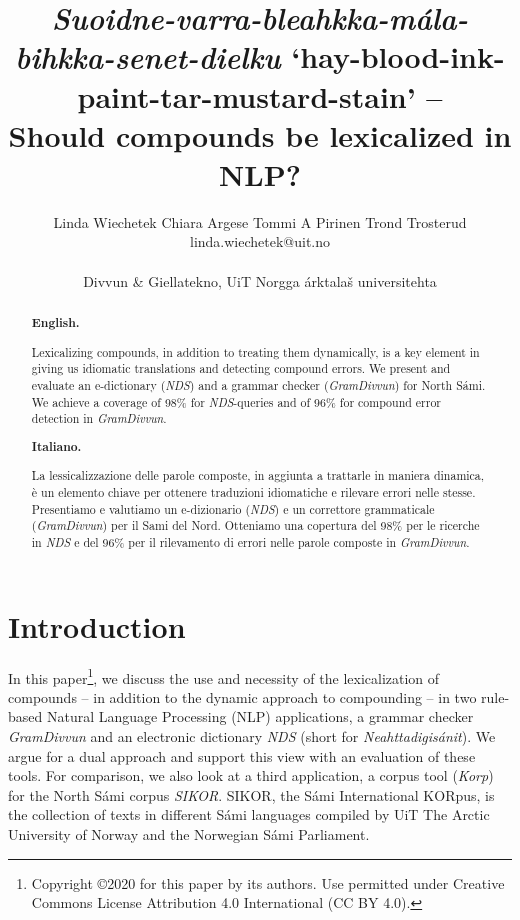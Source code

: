 \documentclass[free]{flammie}
\title{\textit{Suoidne-varra-bleahkka-mála-bihkka-senet-dielku}
`hay-blood-ink-paint-tar-mustard-stain' -- \\ Should compounds be lexicalized in NLP?
\footnotepubrights{Creative Commons CC-BY-SA by conference, the official version
published in CEUR-WS at \url{http://ceur-ws.org/Vol-2769/paper_49.pdf}}}
\author{Linda Wiechetek \qquad Chiara Argese \qquad Tommi A Pirinen \qquad Trond Trosterud\\
{\small linda.wiechetek@uit.no} \qquad {\small chiara.argese@uit.no} \qquad {\small tommi.pirinen@uit.no} \qquad {\small trond.trosterud@uit.no}\\
\\
\vspace{2ex}
  Divvun \& Giellatekno,
  UiT Norgga árktalaš universitehta \\}
\date{}
\begin{document}
\maketitle
\begin{abstract}
  \textbf{English.}

\small Lexicalizing compounds, in addition to treating them dynamically,
is a key element in giving us
idiomatic translations and detecting compound errors.
We present and evaluate an e-dictionary (\textit{NDS}) and
a grammar checker (\textit{GramDivvun}) for North Sámi. We achieve a coverage of
98\% for \textit{NDS}-queries and
of 96\% for compound error detection in \textit{GramDivvun}.
\end{abstract}

\begin{abstract}
 \textrm{\bf{Italiano.}}

\small La lessicalizzazione delle parole composte, in aggiunta a trattarle in maniera dinamica, è un elemento chiave
per ottenere traduzioni idiomatiche e rilevare errori nelle stesse.
Presentiamo e valutiamo un e-dizionario (\textit{NDS}) e un correttore
grammaticale (\textit{GramDivvun}) per il Sami del Nord. Otteniamo una
copertura del 98\% per le ricerche in \textit{NDS} e del 96\% per il rilevamento di errori nelle parole composte in
\textit{GramDivvun}.

\end{abstract}

\section{Introduction}


In this paper\footnote{Copyright ©️2020 for this paper by its authors. Use permitted under Creative Commons License Attribution 4.0 International (CC BY 4.0).}, we discuss the use and necessity of the lexicalization of
compounds -- in addition to the dynamic approach to compounding -- in two rule-based Natural Language Processing (NLP)
applications, a grammar checker \textit{GramDivvun} and an electronic
dictionary \textit{NDS} (short for \textit{Neahttadigisánit}).
We argue for a dual approach and support this view with an
evaluation of these tools. For comparison, we also look at a third
application, a corpus tool (\textit{Korp}) for the North Sámi corpus
\textit{SIKOR}. SIKOR, the Sámi International KORpus, is the collection of texts in different Sámi languages compiled by UiT The Arctic University of Norway and the Norwegian Sámi Parliament.
\end{document}
